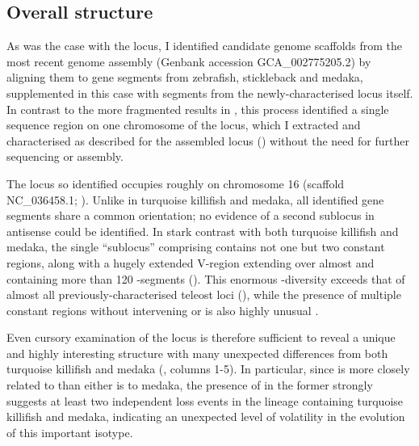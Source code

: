 \subsection{Overall structure}
\label{sec:xma-locus-structure}
	
As was the case with the \Nfu \igh{} locus, I identified candidate genome scaffolds from the most recent \xma genome assembly (Genbank accession GCA\_002775205.2) by aligning them to \igh{} gene segments from zebrafish, stickleback and medaka, supplemented in this case with segments from the newly-characterised \Nfu locus itself. In contrast to the more fragmented results in \Nfu, this process identified a single sequence region on one chromosome of the \Xma locus, which I extracted and characterised as described for the assembled \Nfu locus () without the need for further sequencing or assembly.

The \Xma \igh{} locus so identified occupies roughly  on chromosome 16 (scaffold NC\_036458.1; ). Unlike in turquoise killifish and medaka, all identified gene segments share a common orientation; no evidence of a second sublocus in antisense could be identified. In stark contrast with both turquoise killifish and medaka, the single ``sublocus'' comprising \Xma \igh{} contains not one but two  constant regions, along with a hugely extended V-region extending over almost  and containing more than 120 \vh-segments (). This enormous \vh-diversity exceeds that of almost all previously-characterised teleost \igh{} loci (), while the presence of multiple  constant regions without intervening  or  is also highly unusual \parencite{fillatreau2013astonishing}. 

Even cursory examination of the \Xma \igh{} locus is therefore sufficient to reveal a unique and highly interesting structure with many unexpected differences from both turquoise killifish and medaka (, columns 1-5). In particular, since \Xma is more closely related to \Nfu than either is to medaka, the presence of  in the former strongly suggests at least two independent loss events in the lineage containing turquoise killifish and medaka, indicating an unexpected level of volatility in the evolution of this important isotype.
 
